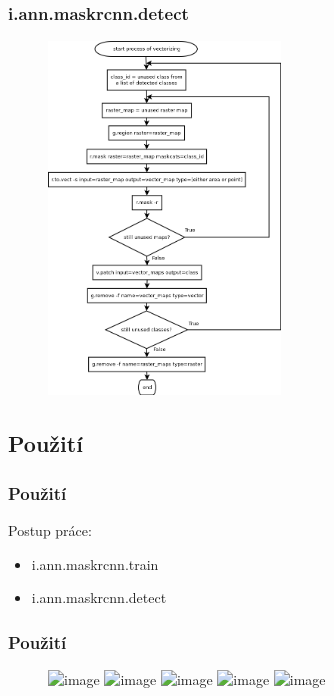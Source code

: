 \documentclass{beamer}
\begin{document}

\begin{frame}

\frametitle{i.ann.maskrcnn.detect}

\begin{figure}[ht]
	\includegraphics[width=0.55\textwidth]{pictures/vectorize.png}
\end{figure}
\end{frame}


\subsection{Použití}

\begin{frame}

\frametitle{Použití}

Postup práce:
\begin{itemize}
	\item i.ann.maskrcnn.train
	\item i.ann.maskrcnn.detect
\end{itemize}

\end{frame}


\begin{frame}

\frametitle{Použití}

\begin{figure}[ht]
	\includegraphics<1>[width=.9\textwidth]{pictures/gui-train-01.png}
	\includegraphics<2>[width=.9\textwidth]{pictures/gui-train-02.png}
	\includegraphics<3>[width=.9\textwidth]{pictures/gui-train-03.png}
	\includegraphics<4>[width=.9\textwidth]{pictures/gui-detect-01.png}
	\includegraphics<5>[width=.9\textwidth]{pictures/gui-detect-02.png}
\end{figure}

\end{frame}
\end{document}
